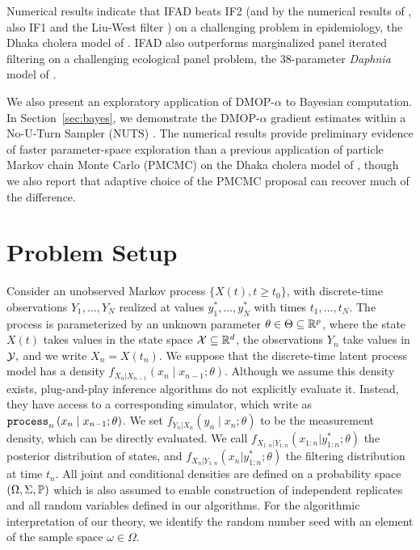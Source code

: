 \documentclass[numsec,webpdf,modern,medium,namedate]{oup-authoring-template}
\begin{document}
Numerical results indicate that IFAD beats IF2 (and by the numerical results of \cite{ionides15}, also IF1 and the Liu-West filter \citep{liuwest01}) on a challenging problem in epidemiology, the Dhaka cholera model of \cite{king08}.
IFAD also outperforms marginalized panel iterated filtering on a challenging ecological panel problem, the 38-parameter \textit{Daphnia} model of \citet{yang25daphnia}.
\newEdit{\editPlugAndPlay}

We also present an exploratory application of DMOP-$\alpha$ to Bayesian computation.
In Section~\ref{sec:bayes}, we demonstrate the DMOP-$\alpha$ gradient estimates within a No-U-Turn Sampler (NUTS) \citep{hoffman14}.
The numerical results provide preliminary evidence of faster parameter-space exploration than a previous application of particle Markov chain Monte Carlo (PMCMC) on the Dhaka cholera model of \cite{king08}, though we also report that adaptive choice of the PMCMC proposal can recover much of the difference.

\section{Problem Setup}

Consider an unobserved Markov process $\{X(t),t  \geq t_0\}$, with discrete-time observations $Y_1,...,Y_N$ realized at values $y_1^*,\dots,y_N^*$ with times $t_1,\dots, t_N$.
The process is parameterized by an unknown parameter $\theta \in \Theta \subseteq \mathbb{R}^p$, where the state $X(t)$ takes values in the state space ${\mathcal{X}} \subseteq \mathbb{R}^d$, the observations $Y_n$ take values in ${\mathcal{Y}},$ and we write $X_n = X(t_n)$. We suppose that the discrete-time latent process model has a density $f_{X_n|X_{n-1}}\left(x_{n} \mid x_{n-1}; \theta\right)$.
Although we assume this density exists, plug-and-play inference algorithms do not explicitly evaluate it.
Instead, they have access to a corresponding simulator, which write as $\texttt{process}_n\left(x_n\mid x_{n-1}; \theta\right)$.
We set $f_{Y_n|X_n}\left(y_n \mid x_n; \theta\right)$ to be the measurement density, which can be directly evaluated. 
We call $f_{X_{1:n}|Y_{1:n}}(x_{1:n}|y_{1:n}^*; \theta)$ the posterior distribution of states, and $f_{X_{n}|Y_{1:n}}(x_n|y_{1:n}^*; \theta)$ the filtering distribution at time $t_n$.
All joint and conditional densities are defined on a probability space $(\Omega, \Sigma, \mathbb{P})$ which is also assumed to enable construction of independent replicates and all random variables defined in our algorithms.
For the algorithmic interpretation of our theory, we identify the random number seed with an element of the sample space $\omega \in \Omega$.
\end{document}
